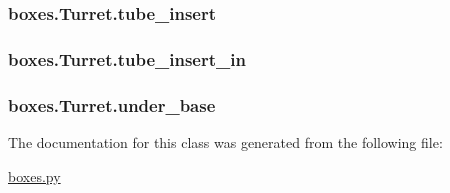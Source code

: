 \subsubsection[{tube\+\_\+insert}]{\setlength{\rightskip}{0pt plus 5cm}boxes.\+Turret.\+tube\+\_\+insert}\label{classboxes_1_1_turret_a54964571038999e8bb1d1fdd7925d280}
\hypertarget{classboxes_1_1_turret_ae048a79551ef7acf28b6f4621a2ef5a4}{}
\subsubsection[{tube\+\_\+insert\+\_\+in}]{\setlength{\rightskip}{0pt plus 5cm}boxes.\+Turret.\+tube\+\_\+insert\+\_\+in}\label{classboxes_1_1_turret_ae048a79551ef7acf28b6f4621a2ef5a4}
\hypertarget{classboxes_1_1_turret_a1b7fc41b7419700d5ec007f56ba8a3cc}{}
\subsubsection[{under\+\_\+base}]{\setlength{\rightskip}{0pt plus 5cm}boxes.\+Turret.\+under\+\_\+base}\label{classboxes_1_1_turret_a1b7fc41b7419700d5ec007f56ba8a3cc}


The documentation for this class was generated from the following file\+:\begin{DoxyCompactItemize}
\item 
\hyperlink{boxes_8py}{boxes.\+py}\end{DoxyCompactItemize}
